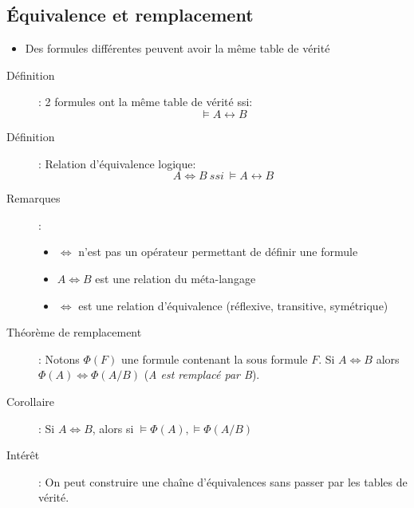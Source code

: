 \documentclass[10pt,a4paper]{article}
\begin{document}
	\subsection{Équivalence et remplacement}
		\begin{itemize}
			\item Des formules différentes peuvent avoir la même table de vérité
		\end{itemize}
		\begin{description}
			\item[Définition]: 2 formules ont la même table de vérité ssi: \[ \vDash A \leftrightarrow B \]
			\item[Définition]: Relation d'équivalence logique: \[A\Leftrightarrow B\: ssi\: \vDash A \leftrightarrow B\]
			\item[Remarques]:
			\begin{itemize}
				\item $\Leftrightarrow$ n'est pas un opérateur permettant de définir une formule
				\item $A\Leftrightarrow B$ est une relation du méta-langage
				\item $\Leftrightarrow$ est une relation d'équivalence (réflexive, transitive, symétrique)
			\end{itemize}
			\item[Théorème de remplacement]: Notons $\Phi(F)$ une formule contenant la sous formule $F$. Si $A\Leftrightarrow B$ alors $\Phi(A)\Leftrightarrow \Phi(A/B)$ (\emph{A est remplacé par B}).
			\item[Corollaire]: Si $A\Leftrightarrow B$, alors si $\vDash\Phi(A), \vDash\Phi(A/B)$
			\item[Intérêt]: On peut construire une chaîne d'équivalences sans passer par les tables de vérité.
		\end{description}
\end{document}
